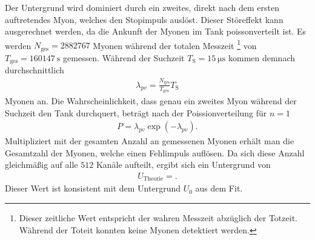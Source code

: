 Der Untergrund wird dominiert durch ein zweites, direkt nach dem ersten auftretendes Myon, welches den Stopimpuls auslöst.
Dieser Störeffekt kann ausgerechnet werden, da die Ankunft der Myonen im Tank poissonverteilt ist.
Es werden $N_\text{ges} = \num{2882767}$ Myonen während der totalen Messzeit \footnote{Dieser zeitliche Wert entspricht der wahren Messzeit abzüglich der Totzeit. Während der Toteit konnten keine Myonen detektiert werden.} von $T_\text{ges} = \SI{160147}{\second}$ gemessen.
Während der Suchzeit $T_\text{S} = \SI{15}{\micro\second}$ kommen demnach durchschnittlich
\begin{align*}
  \lambda_{pv} = \frac{N_\text{ges}}{T_\text{ges}} T_\text{S}
\end{align*}
Myonen an.
Die Wahrscheinlichkeit, dass genau ein zweites Myon während der Suchzeit den Tank durchquert, beträgt nach der Poissionverteilung für $n=1$
\begin{align*}
  P = \lambda_{pv} \exp{\left(-\lambda_{pv}\right)}.
\end{align*}
Multipliziert mit der gesamten Anzahl an gemessenen Myonen erhält man die Gesamtzahl der Myonen, welche einen Fehlimpuls auflösen.
Da sich diese Anzahl gleichmäßig auf alle $\num{512}$ Kanäle aufteilt, ergibt sich ein Untergrund von
\begin{align*}
  U_{\text{Theorie}} = .
\end{align*}
Dieser Wert ist konsistent mit dem Untergrund $U_0$ aus dem Fit.
